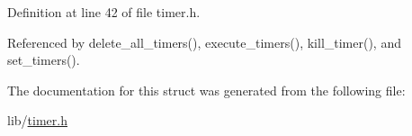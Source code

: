 Definition at line 42 of file timer.\-h.



Referenced by delete\-\_\-all\-\_\-timers(), execute\-\_\-timers(), kill\-\_\-timer(), and set\-\_\-timers().



The documentation for this struct was generated from the following file\-:\begin{DoxyCompactItemize}
\item 
lib/\hyperlink{timer_8h}{timer.\-h}\end{DoxyCompactItemize}
